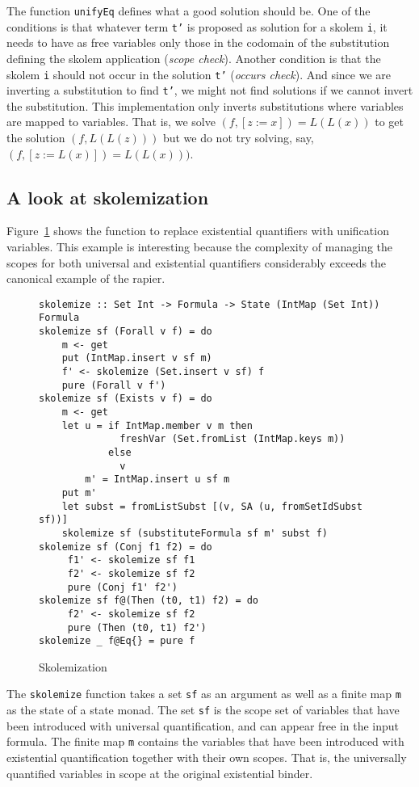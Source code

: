 \documentclass[sigconf, review]{acmart}
\newcommand{\tc}[1]{{\small\texttt{#1}}}
\begin{document}
The function \tc{unifyEq} defines what a good solution should be.
One of the conditions is that whatever term \tc{t'} is proposed
as solution for a skolem \tc{i}, it needs to have as free variables only those in the
codomain of the substitution defining the skolem application
(\textit{scope check}). Another
condition is that the skolem \tc{i} should not occur in the solution
\tc{t'} (\textit{occurs check}). And since we are inverting a substitution to find
\tc{t'}, we might not find solutions if we cannot invert the
substitution. This implementation only inverts substitutions where
variables are mapped to variables. That is, we solve $(f, [z:=x]) = L(L(x))$
to get the solution $(f, L(L(z)))$ but we do not try solving, say, $(f, [z:=L(x)]) = L(L(x)))$.


\subsection{A look at skolemization}
\label{sec:skolemize}

Figure~\ref{skolemization} shows the function to replace existential quantifiers
with unification variables. This example is interesting because the complexity of
managing the scopes for both universal and existential quantifiers
considerably exceeds the canonical example of the rapier.

\begin{figure}
\begin{verbatim}
skolemize :: Set Int -> Formula -> State (IntMap (Set Int)) Formula
skolemize sf (Forall v f) = do
    m <- get
    put (IntMap.insert v sf m)
    f' <- skolemize (Set.insert v sf) f
    pure (Forall v f')
skolemize sf (Exists v f) = do
    m <- get
    let u = if IntMap.member v m then
              freshVar (Set.fromList (IntMap.keys m))
            else
              v
        m' = IntMap.insert u sf m
    put m'
    let subst = fromListSubst [(v, SA (u, fromSetIdSubst sf))]
    skolemize sf (substituteFormula sf m' subst f)
skolemize sf (Conj f1 f2) = do
     f1' <- skolemize sf f1
     f2' <- skolemize sf f2
     pure (Conj f1' f2')
skolemize sf f@(Then (t0, t1) f2) = do
     f2' <- skolemize sf f2
     pure (Then (t0, t1) f2')
skolemize _ f@Eq{} = pure f
\end{verbatim}
\caption{Skolemization}
\label{skolemization}
\end{figure}

The \tc{skolemize} function takes a set \tc{sf} as an argument as well as a
finite map \tc{m} as the state of a state monad. The set \tc{sf} is the scope set
of variables that have been
introduced with universal quantification, and can appear free in the
input formula. The finite map \tc{m} contains the variables
that have been introduced with existential quantification together with their own
scopes. That is, the universally quantified variables in scope at the original existential
binder.
\end{document}
